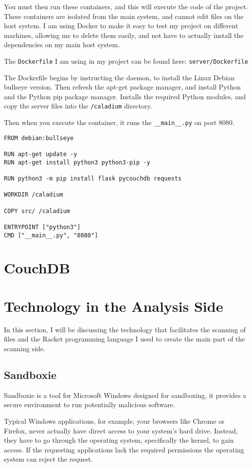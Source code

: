 You must then run these containers, and this will execute the code of the project.
These containers are isolated from the main system, and cannot edit files on the host system.
I am using Docker to make it easy to test my project on different machines,
allowing me to delete them easily,
and not have to actually install the dependencies on my main host system.

The \texttt{Dockerfile} I am using in my project can be found here:
\texttt{server/Dockerfile}

The Dockerfile begins by instructing the daemon,
to install the Linux Debian bullseye version.
Then refresh the apt-get package manager,
and install Python and the Python pip package manager.
Installs the required Python modules,
and copy the server files into the \texttt{/caladium} directory.

Then when you execute the container,
it runs the \texttt{\_\_main\_\_.py} on port 8080.

\begin{lstlisting}
FROM debian:bullseye

RUN apt-get update -y
RUN apt-get install python3 python3-pip -y

RUN python3 -m pip install flask pycouchdb requests

WORKDIR /caladium

COPY src/ /caladium

ENTRYPOINT ["python3"]
CMD ["__main__.py", "8080"]
\end{lstlisting}

\section{CouchDB}

\section{Technology in the Analysis Side}
In this section, I will be discussing the technology that
facilitates the scanning of files and the Racket programming language
I used to create the main part of the scanning side.

\subsection{Sandboxie}
Sandboxie is a tool for Microsoft Windows designed for sandboxing,
it provides a secure environment to run potentially malicious software.

Typical Windows applications, for example, your browsers like Chrome or Firefox,
never actually have direct access to your system's hard drive.
Instead, they have to go through the operating system, specifically the kernel,
to gain access. If the requesting applications lack the required permissions
the operating system can reject the request.

